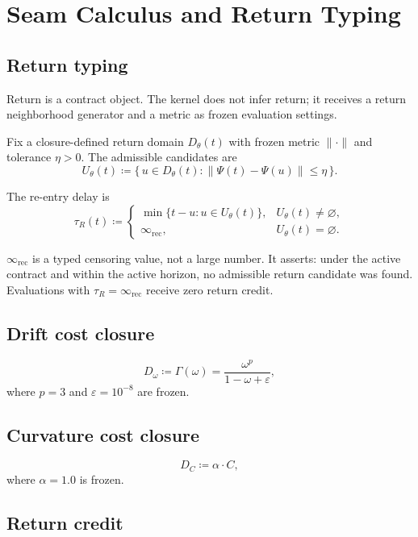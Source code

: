\documentclass[
  aps,
  prd,
  twocolumn,
  superscriptaddress,
  nofootinbib,
  floatfix
]{revtex4-2}
\newcommand{\tR}{\tau_{\!R}}
\newcommand{\Gam}{\Gamma}
\newcommand{\eps}{\varepsilon}
\newcommand{\IR}{\infty_{\mathrm{rec}}}
\newcommand{\beq}{\begin{equation}}
\newcommand{\eeq}{\end{equation}}
\begin{document}
\section{Seam Calculus and Return Typing}\label{sec:seam}

\subsection{Return typing}\label{sec:return}

Return is a contract object.  The kernel does not infer return; it
receives a return neighborhood generator and a metric as frozen
evaluation settings.

Fix a closure-defined return domain $D_\theta(t)$ with frozen
metric $\|\cdot\|$ and tolerance $\eta > 0$.  The admissible
candidates are
\beq
  U_\theta(t) \coloneqq \bigl\{\,u \in D_\theta(t) :
  \|\Psi(t) - \Psi(u)\| \leq \eta\,\bigr\}.
\eeq

The re-entry delay is
\beq
  \tR(t) \coloneqq
  \begin{cases}
    \min\{t - u : u \in U_\theta(t)\}, &
      U_\theta(t) \neq \varnothing, \\
    \IR, & U_\theta(t) = \varnothing.
  \end{cases}
\eeq

$\IR$ is a typed censoring value, not a large number.  It asserts:
under the active contract and within the active horizon, no
admissible return candidate was found.  Evaluations with
$\tR = \IR$ receive zero return credit.

\subsection{Drift cost closure}

\beq
  D_\omega \coloneqq \Gam(\omega)
  = \frac{\omega^p}{1 - \omega + \eps},
\eeq
where $p = 3$ and $\eps = 10^{-8}$ are frozen.

\subsection{Curvature cost closure}

\beq
  D_C \coloneqq \alpha \cdot C,
\eeq
where $\alpha = 1.0$ is frozen.

\subsection{Return credit}
\end{document}

